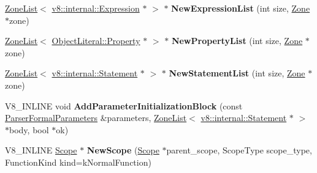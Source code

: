 \begin{DoxyCompactItemize}
\item 
\hyperlink{classv8_1_1internal_1_1_zone_list}{Zone\+List}$<$ \hyperlink{classv8_1_1internal_1_1_expression}{v8\+::internal\+::\+Expression} $\ast$ $>$ $\ast$ {\bfseries New\+Expression\+List} (int size, \hyperlink{classv8_1_1internal_1_1_zone}{Zone} $\ast$zone)\hypertarget{classv8_1_1internal_1_1_parser_traits_aca555b86940ad02d2f75e8add6422b98}{}\label{classv8_1_1internal_1_1_parser_traits_aca555b86940ad02d2f75e8add6422b98}

\item 
\hyperlink{classv8_1_1internal_1_1_zone_list}{Zone\+List}$<$ \hyperlink{classv8_1_1internal_1_1_object_literal_property}{Object\+Literal\+::\+Property} $\ast$ $>$ $\ast$ {\bfseries New\+Property\+List} (int size, \hyperlink{classv8_1_1internal_1_1_zone}{Zone} $\ast$zone)\hypertarget{classv8_1_1internal_1_1_parser_traits_a2ca8071c6a740b06803ddefb38eb0f96}{}\label{classv8_1_1internal_1_1_parser_traits_a2ca8071c6a740b06803ddefb38eb0f96}

\item 
\hyperlink{classv8_1_1internal_1_1_zone_list}{Zone\+List}$<$ \hyperlink{classv8_1_1internal_1_1_statement}{v8\+::internal\+::\+Statement} $\ast$ $>$ $\ast$ {\bfseries New\+Statement\+List} (int size, \hyperlink{classv8_1_1internal_1_1_zone}{Zone} $\ast$zone)\hypertarget{classv8_1_1internal_1_1_parser_traits_aa6ec83169ac86f12d0823b9a3330397d}{}\label{classv8_1_1internal_1_1_parser_traits_aa6ec83169ac86f12d0823b9a3330397d}

\item 
V8\+\_\+\+I\+N\+L\+I\+NE void {\bfseries Add\+Parameter\+Initialization\+Block} (const \hyperlink{structv8_1_1internal_1_1_parser_formal_parameters}{Parser\+Formal\+Parameters} \&parameters, \hyperlink{classv8_1_1internal_1_1_zone_list}{Zone\+List}$<$ \hyperlink{classv8_1_1internal_1_1_statement}{v8\+::internal\+::\+Statement} $\ast$ $>$ $\ast$body, bool $\ast$ok)\hypertarget{classv8_1_1internal_1_1_parser_traits_a140f36ba0ab031860cd75f208c2a92de}{}\label{classv8_1_1internal_1_1_parser_traits_a140f36ba0ab031860cd75f208c2a92de}

\item 
V8\+\_\+\+I\+N\+L\+I\+NE \hyperlink{classv8_1_1internal_1_1_scope}{Scope} $\ast$ {\bfseries New\+Scope} (\hyperlink{classv8_1_1internal_1_1_scope}{Scope} $\ast$parent\+\_\+scope, Scope\+Type scope\+\_\+type, Function\+Kind kind=k\+Normal\+Function)\hypertarget{classv8_1_1internal_1_1_parser_traits_ac68bc9d14662faf42d4684808d0b4ac2}{}\label{classv8_1_1internal_1_1_parser_traits_ac68bc9d14662faf42d4684808d0b4ac2}


\end{DoxyCompactItemize}
